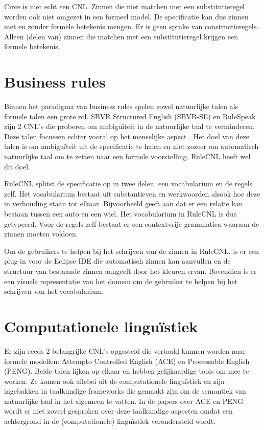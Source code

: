 Circe is niet echt een CNL. Zinnen die niet matchen met een substitutieregel worden ook niet omgezet in een formeel model. De specificatie kan dus zinnen met en zonder formele betekenis mengen. Er is geen sprake van constructieregels. Alleen (delen van) zinnen die matchen met een substitutieregel krijgen een formele betekenis.

\section{Business rules}
Binnen het paradigma van business rules spelen zowel natuurlijke talen als formele talen een grote rol. SBVR Structured English (SBVR-SE) \cite{Levy2013} en RuleSpeak \cite{Ross2009a} zijn 2 CNL's die proberen om ambigu\"iteit in de natuurlijke taal te verminderen. Deze talen focussen echter vooral op het menselijke aspect \cite{Njonko2014}. Het doel van deze talen is om ambigu\"iteit uit de specificatie te halen en niet zozeer om automatisch natuurlijke taal om te zetten naar een formele voorstelling. RuleCNL \cite{Njonko2014} heeft wel dit doel.

RuleCNL splitst de specificatie op in twee delen: een vocabularium en de regels zelf. Het vocabularium bestaat uit substantieven en werkwoorden alsook hoe deze in verhouding staan tot elkaar. Bijvoorbeeld  geeft aan dat er een relatie kan bestaan tussen een auto en een wiel. Het vocabularium in RuleCNL is dus getypeerd. Voor de regels zelf bestaat er een contextvrije grammatica waaraan de zinnen moeten voldoen.

Om de gebruikers te helpen bij het schrijven van de zinnen in RuleCNL, is er een plug-in voor de Eclipse IDE die automatisch zinnen kan aanvullen en de structuur van bestaande zinnen aangeeft door het kleuren ervan. Bovendien is er een visuele representatie van het domein om de gebruiker te helpen bij het schrijven van het vocabularium.

\section{Computationele lingu\"istiek} Er zijn reeds 2 belangrijke CNL's opgesteld die vertaald kunnen worden naar formele modellen: Attempto Controlled English (ACE) en Processable English (PENG). Beide talen lijken op elkaar en hebben gelijkaardige tools om mee te werken. Ze komen ook allebei uit de computationele lingu\"istiek en zijn ingebakken in taalkundige frameworks die gemaakt zijn om de semantiek van natuurlijke taal in het algemeen te vatten. In de papers over ACE en PENG wordt er niet zoveel gesproken over deze taalkundige aspecten omdat een achtergrond in de (computationele) lingu\"istiek verondersteld wordt.

